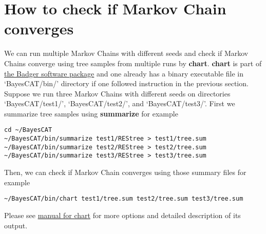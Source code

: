 \documentclass[11pt]{article}
\begin{document}
\section{How to check if Markov Chain converges}
\label{sec-6}
We can run multiple Markov Chains with different seeds and check if Markov Chains converge using tree samples from multiple runs by \textbf{chart}. \textbf{chart} is part of \href{http://badger.duq.edu/}{the Badger software package} and one already has a binary executable file in `BayesCAT/bin/' directory if one followed instruction in the previous section. Suppose we run three Markov Chains with different seeds on directories `BayesCAT/test1/', `BayesCAT/test2/', and `BayesCAT/test3/'. First we summarize tree samples using \textbf{summarize} for example
\begin{lstlisting}
cd ~/BayesCAT
~/BayesCAT/bin/summarize test1/REStree > test1/tree.sum
~/BayesCAT/bin/summarize test2/REStree > test2/tree.sum
~/BayesCAT/bin/summarize test3/REStree > test3/tree.sum
\end{lstlisting}
Then, we can check if Markov Chain converges using those summary files for example
\begin{lstlisting}
~/BayesCAT/bin/chart test1/tree.sum test2/tree.sum test3/tree.sum
\end{lstlisting}

Please see \href{http://badger.duq.edu/manual2/chart.html}{manual for chart} for more options and detailed description of its output. 
\end{document}
